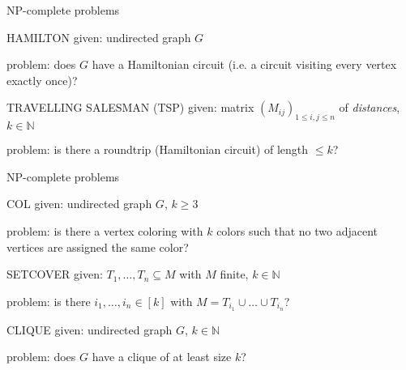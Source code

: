 \documentclass{beamer}
\theoremstyle{definition}
\begin{document}
\begin{frame}{NP-complete problems}

\begin{block}{HAMILTON}
given: undirected graph $G$\par
problem: does $G$ have a Hamiltonian circuit (i.e. a circuit visiting every vertex exactly once)?
\end{block}\pause

\begin{block}{TRAVELLING SALESMAN (TSP)}
given: matrix $(M_{ij})_{1\leq i,j \leq n}$ of \textit{distances}, $k \in \mathbb{N}$\par
problem: is there a roundtrip (Hamiltonian circuit) of length $\leq k$?
\end{block}

\end{frame}

\begin{frame}{NP-complete problems}

\begin{block}{COL}
given: undirected graph $G$, $k \geq 3$\par
problem: is there a vertex coloring with $k$ colors such that no two adjacent vertices are assigned the same color?
\end{block}\pause

\begin{block}{SETCOVER}
given: $T_1,\ldots,T_n \subseteq M$ with $M$ finite, $k \in \mathbb{N}$\par
problem: is there $i_1,\ldots,i_n \in [k]$ with $M = T_{i_1} \cup \dots \cup T_{i_n}$?
\end{block}\pause

\begin{block}{CLIQUE}
given: undirected graph $G$, $k \in \mathbb{N}$\par
problem: does $G$ have a clique of at least size $k$?
\end{block}

\end{frame}
\end{document}
